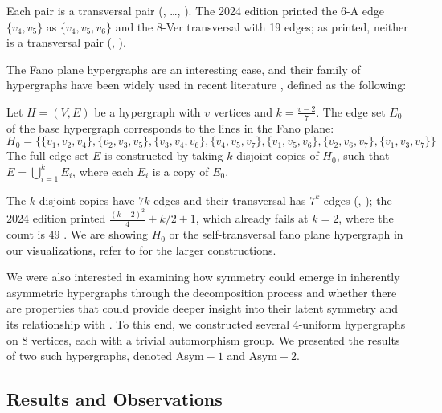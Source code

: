 Each pair is a transversal pair (, \dots, ). The 2024 edition printed the 6-A edge $\{v_4,v_5\}$ as $\{v_4,v_5,v_6\}$ and the 8-Ver transversal with 19 edges; as printed, neither is a transversal pair (, ).

The Fano plane hypergraphs are an interesting case, and their family of hypergraphs have been widely used in recent literature \cite{Uno24}, defined as the following:

\begin{definition}
Let $H=(V,E)$ be a hypergraph with $v$ vertices and $k=\frac{v-2}{7}$. The edge set $E_0$ of the base hypergraph corresponds to the lines in the Fano plane:
\[
H_0=\{\{v_1,v_2,v_4\},\{v_2,v_3,v_5\},\{v_3,v_4,v_6\},\{v_4,v_5,v_7\},\{v_1,v_5,v_6\},\{v_2,v_6,v_7\},\{v_1,v_3,v_7\}\}
\]
The full edge set $E$ is constructed by taking $k$ disjoint copies of $H_0$, such that $E=\bigcup_{i=1}^{k}E_i$, where each $E_i$ is a copy of $E_0$.
\end{definition}

The $k$ disjoint copies have $7k$ edges and their transversal has $7^k$ edges (, ); the 2024 edition printed $\frac{(k-2)^2}{4}+k/2+1$, which already fails at $k=2$, where the count is $49$ . We are showing $H_0$ or the self-transversal fano plane hypergraph in our visualizations, refer to \cite{Uno24} for the larger constructions.

We were also interested in examining how symmetry could emerge in inherently asymmetric hypergraphs through the decomposition process and whether there are properties that could provide deeper insight into their latent symmetry and its relationship with \FKA. To this end, we constructed several 4-uniform hypergraphs on 8 vertices, each with a trivial automorphism group. We presented the results of two such hypergraphs, denoted $\mathrm{Asym}-1$ and $\mathrm{Asym}-2$.

\subsection{Results and Observations}

